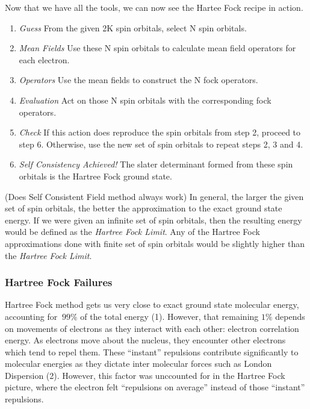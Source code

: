 \documentclass{article}
\begin{document}
       Now that we have all the tools, we can now see the Hartee Fock recipe in
       action.
       \begin{enumerate}
         \item \textit{Guess} From the given 2K spin orbitals, select N spin
                orbitals.
         \item \textit{Mean Fields} Use these N spin orbitals to calculate mean
                field operators for each electron.
         \item \textit{Operators} Use the mean fields to construct the N fock operators.
         \item \textit{Evaluation} Act on those N spin orbitals with the
                corresponding fock operators.
         \item \textit{Check} If this action does reproduce the spin orbitals from
               step 2, proceed to step 6. Otherwise, use the new set of
               spin orbitals to repeat steps 2, 3 and 4.
         \item \textit{Self Consistency Achieved!} The slater determinant formed from
               these spin orbitals is the Hartree Fock ground state.
       \end{enumerate}
       (Does Self Consistent Field method always work)
       In general, the larger the given set of spin orbitals, the better the
       approximation to the exact ground state energy. If we were given an infinite set
       of spin orbitals, then the resulting energy would be defined as the
       \textit{Hartree Fock Limit}. Any of the Hartree Fock approximations done with
       finite set of spin orbitals would be slightly higher than the
       \textit{Hartree Fock Limit}.










    \subsubsection{Hartree Fock Failures}

      Hartree Fock method gets us very close to exact ground state molecular
      energy, accounting for \(~99\%\) of the total energy (1). However, that
      remaining \(1\%\) depends on movements of electrons as they interact
      with each other: electron correlation energy. As electrons move about the
      nucleus, they encounter other electrons which tend to repel them. These
      ``instant'' repulsions contribute significantly to molecular energies
      as they dictate inter molecular forces such as London Dispersion (2). However,
      this factor was unccounted for in the Hartree Fock picture, where the
      electron felt ``repulsions on average'' instead of those ``instant''
      repulsions.
\end{document}
